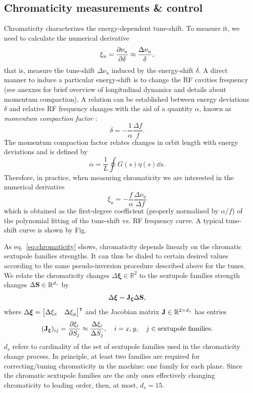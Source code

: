 \subsection{Chromaticity measurements \& control}
Chromaticity characterizes the energy-dependent tune-shift. To measure it, we need to calculate the numerical derivative
$$\xi_u = \pdv{\nu_u}{\delta}\approx \frac{\Delta \nu_u}{\delta},$$
that is, measure the tune-shift $\Delta \nu_u$ induced by the energy-shift $\delta$. A direct manner to induce a particular energy-shift is to change the RF cavities frequency (see anexxes for brief overview of longitudinal dynamics and details about momentum compaction). A relation can be established between energy deviations $\delta$ and relative RF frequency changes with the aid of a quantity $\alpha$, known as \textit{momentum compaction factor} \cite{lee_accelerator_2004,sands_physics_1969}:
\begin{equation}
    \delta = -\frac{1}{\alpha}\frac{\Delta f}{f}.
\end{equation}
The momentum compaction factor relates changes in orbit length with energy deviations and is defined by
\begin{equation}
    \alpha = \frac{1}{L}\oint G(s) \eta(s) \dd{s}.
\end{equation}
Therefore, in practice, when measuring chromaticity we are interested in the numerical derivative
\begin{equation}
\xi_u = -\frac{f}{\alpha}\frac{\Delta \nu_u}{\Delta f}
\end{equation}
which is obtained as the first-degree coefficient (properly normalized by $\alpha/f$) of the polynomial fitting of the tune-shift vs. RF frequency curve. A typical tune-shift curve is shown by Fig.

As eq.~\eqref{eq:chromaticity} shows, chromaticity depends linearly on the chromatic sextupole families strengths. It can thus be dialed to certain desired values according to the same pseudo-inversion procedure described above for the tunes. We relate the chromaticity changes $\Delta \boldsymbol{\xi}\in\mathbb{R}^2$ to the sextupole families strength changes $\Delta \vb{S}\in\mathbb{R}^{d_s}$ by
\begin{equation}
    \Delta\boldsymbol{\xi} = \vb{J}_{\boldsymbol{\xi}}\Delta \vb{S},
\end{equation}
where $\Delta\boldsymbol{\xi} = \mqty*[\Delta \xi_x & \Delta \xi_y]^\intercal$ and the Jacobian matrix $\vb{J}\in\mathbb{R}^{2 \times d_s}$ has entries
\begin{equation}
    (\vb{J}_{\boldsymbol{\xi}})_{ij} = \pdv{\xi_{i}}{S_j} \approx \frac{\Delta \xi_{i}}{\Delta S_j},\quad i=x, y, \quad j\in\text{sextupole families}.
\end{equation}
$d_s$ refers to cardinality of the set of sextupole families used in the chromaticity change process. In principle, at least two families are required for correcting/tuning chromaticity in the machine: one family for each plane. Since the chromatic sextupole families are the only ones effectively changing chromaticity to leading order, then, at most, $d_s=15$.

